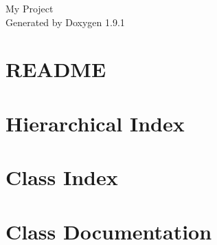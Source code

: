 \let\mypdfximage\pdfximage\def\pdfximage{\immediate\mypdfximage}\documentclass[twoside]{book}
\newcommand{\+}{\discretionary{\mbox{\scriptsize$\hookleftarrow$}}{}{}}
\newcommand{\clearemptydoublepage}{%
  \newpage{\pagestyle{empty}\cleardoublepage}%
}
\begin{document}
\raggedbottom

\hypersetup{pageanchor=false,
             bookmarksnumbered=true,
             pdfencoding=unicode
            }
\begin{titlepage}
\vspace*{7cm}
\begin{center}%
{\Large My Project }\\
\vspace*{1cm}
{\large Generated by Doxygen 1.9.1}\\
\end{center}
\end{titlepage}
\clearemptydoublepage
{}
\tableofcontents
\clearemptydoublepage
{}
\hypersetup{pageanchor=true}

\chapter{README}
\label{md_README}

\chapter{Hierarchical Index}

\chapter{Class Index}

\chapter{Class Documentation}















\backmatter
\newpage
{}
\clearemptydoublepage
{}
\printindex
\end{document}
